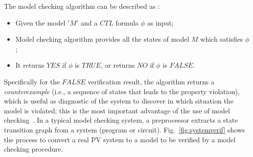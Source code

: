\documentclass[journal]{IEEEtran}
\begin{document}

The model checking algorithm can be described as \cite{ClarkeHV18}:  

\begin{itemize}
\item Given the model $ 'M' $ and a $CTL$ formula $ \phi $ as input;  
\item Model checking algorithm provides all the states of model $ M $ which satisfies $ \phi $;  
\item It returns $YES$ if $ \phi $ is $TRUE$, or returns $NO$ if $ \phi $ is $FALSE$.  
\end{itemize}
Specifically for the $FALSE$ verification result, the algorithm returns a \textit{counterexample} (i.e., a sequence of states that leads to the property violation), which is useful as diagnostic of the system to discover in which situation the model is violated; this is the most important advantage of the use of model checking~\cite{ClarkeHV18}. 
%
%
%
In a typical model checking system, a preprocessor extracts a state transition graph from a system (program or circuit).
%
%
%
Fig.~\ref{fig:systemverif} shows the process to convert a real PV system to a model to be verified by a model checking procedure. %
\end{document}
